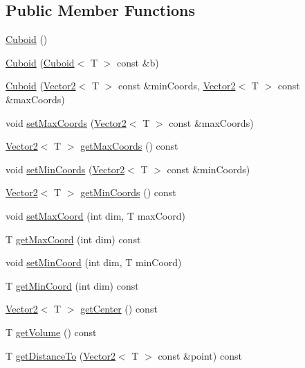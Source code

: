 \subsection*{Public Member Functions}
\begin{DoxyCompactItemize}
\item 
\hyperlink{classfc_1_1Cuboid_a29d8864327254cacd68ce463b4a258f9}{Cuboid} ()
\item 
\hyperlink{classfc_1_1Cuboid_a12532df2783452c02a6e35124a2a8951}{Cuboid} (\hyperlink{classfc_1_1Cuboid}{Cuboid}$<$ T $>$ const \&b)
\item 
\hyperlink{classfc_1_1Cuboid_af5e9fd91f928fa65b2f83eab3028556b}{Cuboid} (\hyperlink{classfc_1_1Vector2}{Vector2}$<$ T $>$ const \&min\+Coords, \hyperlink{classfc_1_1Vector2}{Vector2}$<$ T $>$ const \&max\+Coords)
\item 
void \hyperlink{classfc_1_1Cuboid_a61443edb86d089f4f89e91efbbd74287}{set\+Max\+Coords} (\hyperlink{classfc_1_1Vector2}{Vector2}$<$ T $>$ const \&max\+Coords)
\item 
\hyperlink{classfc_1_1Vector2}{Vector2}$<$ T $>$ \hyperlink{classfc_1_1Cuboid_a27defdb3f39fd0b753190f84b44a0d28}{get\+Max\+Coords} () const
\item 
void \hyperlink{classfc_1_1Cuboid_aac5bb3579d8b522254a56904e6c06a61}{set\+Min\+Coords} (\hyperlink{classfc_1_1Vector2}{Vector2}$<$ T $>$ const \&min\+Coords)
\item 
\hyperlink{classfc_1_1Vector2}{Vector2}$<$ T $>$ \hyperlink{classfc_1_1Cuboid_ac170126dd5127d654d565fdaac76f6b7}{get\+Min\+Coords} () const
\item 
void \hyperlink{classfc_1_1Cuboid_ac30f778d3be6b1a4b174982ea729bddf}{set\+Max\+Coord} (int dim, T max\+Coord)
\item 
T \hyperlink{classfc_1_1Cuboid_aff744fb76a635c4d15de8af208bade19}{get\+Max\+Coord} (int dim) const
\item 
void \hyperlink{classfc_1_1Cuboid_a13c45ce619dbd1e925699f17e582fb2a}{set\+Min\+Coord} (int dim, T min\+Coord)
\item 
T \hyperlink{classfc_1_1Cuboid_a4e5fa796537b42d2e1696fec49739917}{get\+Min\+Coord} (int dim) const
\item 
\hyperlink{classfc_1_1Vector2}{Vector2}$<$ T $>$ \hyperlink{classfc_1_1Cuboid_a3e6ec899bce7492a723ec0fac9c16b81}{get\+Center} () const
\item 
T \hyperlink{classfc_1_1Cuboid_a921b453c11e22a4ec46003f51c7cb9ba}{get\+Volume} () const
\item 
T \hyperlink{classfc_1_1Cuboid_aad6557d3aba44f3230a5376dbe172343}{get\+Distance\+To} (\hyperlink{classfc_1_1Vector2}{Vector2}$<$ T $>$ const \&point) const

\end{DoxyCompactItemize}
